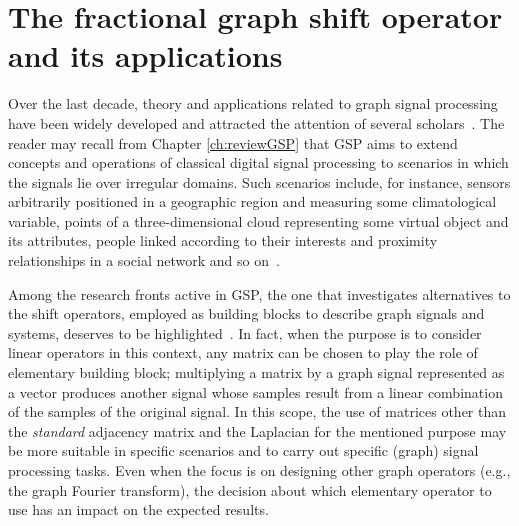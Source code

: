 \chapter{The fractional graph shift operator and its applications}
\label{ch:FrGSO}

Over the last decade, theory and applications related to graph signal processing have been widely developed and attracted the attention of several scholars~\parencite{ortega2018,richard2018,ribeiro2018}. The reader may recall from Chapter \ref{ch:reviewGSP} that GSP aims to extend concepts and operations of classical digital signal processing to scenarios in which the signals lie over irregular domains. Such scenarios include, for instance, sensors arbitrarily positioned in a geographic region and measuring some climatological variable, points of a three-dimensional cloud representing some virtual object and its attributes, people linked according to their interests and proximity relationships in a social network and so on~\parencite{chen2014,zhang2014,benzi2016,weiyu2018,saad2018,jiang2021,gama2019,liu2019,zhang2020,ferreira2020,zhang2021,xiao2021,sun2021}.

Among the research fronts active in GSP, the one that investigates alternatives to the shift operators, employed as building blocks to describe graph signals and systems, deserves to be highlighted~\parencite{girault2015translation,gavili2017,fan20191,fan2019,mollaebrahim2021,shafipour2018,shafipour2019}. {In fact, when the purpose is to consider linear operators in this context, any matrix can be chosen to play the role of elementary building block; multiplying a matrix by a graph signal represented as a vector produces another signal whose samples result from a linear combination of the samples of the original signal. In this scope,} the use of matrices other than the \textit{standard} adjacency matrix and the Laplacian for the mentioned purpose may {be more suitable in specific scenarios and to carry out specific (graph) signal processing tasks. Even when the focus is on designing other graph operators (e.g., the graph Fourier transform), the decision about which elementary operator to use has an impact on the expected results.}

